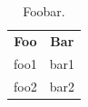 \begin{table}
\begin{ctucolortab}
\begin{tabular}{cc}
\bfseries Foo & \bfseries Bar \\\Midrule
foo1 & bar1 \\
foo2 & bar2
\end{tabular}
\end{ctucolortab}
\caption{Foobar.}
\label{tab:foobar}
\end{table}


